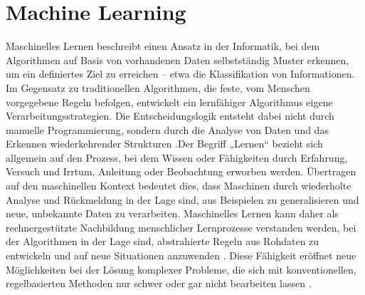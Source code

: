 \section{Machine Learning}
Maschinelles Lernen beschreibt einen Ansatz in der Informatik, bei dem Algorithmen auf Basis von vorhandenen Daten selbstständig Muster erkennen, um ein definiertes Ziel zu erreichen – etwa die Klassifikation von Informationen. Im Gegensatz zu traditionellen Algorithmen, die feste, vom Menschen vorgegebene Regeln befolgen, entwickelt ein lernfähiger Algorithmus eigene Verarbeitungsstrategien. Die Entscheidungslogik entsteht dabei nicht durch manuelle Programmierung, sondern durch die Analyse von Daten und das Erkennen wiederkehrender Strukturen \cite{Shetty2022}.Der Begriff „Lernen“ bezieht sich allgemein auf den Prozess, bei dem Wissen oder Fähigkeiten durch Erfahrung, Versuch und Irrtum, Anleitung oder Beobachtung erworben werden. Übertragen auf den maschinellen Kontext bedeutet dies, dass Maschinen durch wiederholte Analyse und Rückmeldung in der Lage sind, aus Beispielen zu generalisieren und neue, unbekannte Daten zu verarbeiten. Maschinelles Lernen kann daher als rechnergestützte Nachbildung menschlicher Lernprozesse verstanden werden, bei der Algorithmen in der Lage sind, abstrahierte Regeln aus Rohdaten zu entwickeln und auf neue Situationen anzuwenden \cite{Fischer1999, Braga-Neto2020}. Diese Fähigkeit eröffnet neue Möglichkeiten bei der Lösung komplexer Probleme, die sich mit konventionellen, regelbasierten Methoden nur schwer oder gar nicht bearbeiten lassen \cite{Goodfellow-et-al-2016}.



